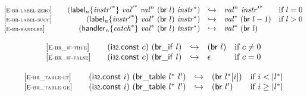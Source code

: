 \vspace{1ex}

$$
\begin{array}[t]{@{}lrcl@{}l@{}}
{[\textsc{\scriptsize E{-}br{-}label{-}zero}]} \quad & ({{\mathsf{label}}_{n}}{\{ {{\mathit{instr}'}^\ast} \}}~{{\mathit{val}'}^\ast}~{{\mathit{val}}^{n}}~(\mathsf{br}~l)~{{\mathit{instr}}^\ast}) & \hookrightarrow & {{\mathit{val}}^{n}}~{{\mathit{instr}'}^\ast} & \quad \mbox{if}~ l = 0 \\
{[\textsc{\scriptsize E{-}br{-}label{-}succ}]} \quad & ({{\mathsf{label}}_{n}}{\{ {{\mathit{instr}'}^\ast} \}}~{{\mathit{val}}^\ast}~(\mathsf{br}~l)~{{\mathit{instr}}^\ast}) & \hookrightarrow & {{\mathit{val}}^\ast}~(\mathsf{br}~l - 1) & \quad \mbox{if}~ l > 0 \\
{[\textsc{\scriptsize E{-}br{-}handler}]} \quad & ({{\mathsf{handler}}_{n}}{\{ {{\mathit{catch}}^\ast} \}}~{{\mathit{val}}^\ast}~(\mathsf{br}~l)~{{\mathit{instr}}^\ast}) & \hookrightarrow & {{\mathit{val}}^\ast}~(\mathsf{br}~l) \\
\end{array}
$$

\vspace{1ex}

$$
\begin{array}[t]{@{}lrcl@{}l@{}}
{[\textsc{\scriptsize E{-}br\_if{-}true}]} \quad & (\mathsf{i{\scriptstyle 32}}{.}\mathsf{const}~c)~(\mathsf{br\_if}~l) & \hookrightarrow & (\mathsf{br}~l) & \quad \mbox{if}~ c \neq 0 \\
{[\textsc{\scriptsize E{-}br\_if{-}false}]} \quad & (\mathsf{i{\scriptstyle 32}}{.}\mathsf{const}~c)~(\mathsf{br\_if}~l) & \hookrightarrow & \epsilon & \quad \mbox{if}~ c = 0 \\
\end{array}
$$

\vspace{1ex}

$$
\begin{array}[t]{@{}lrcl@{}l@{}}
{[\textsc{\scriptsize E{-}br\_table{-}lt}]} \quad & (\mathsf{i{\scriptstyle 32}}{.}\mathsf{const}~i)~(\mathsf{br\_table}~{l^\ast}~{l'}) & \hookrightarrow & (\mathsf{br}~{l^\ast}{}[i]) & \quad \mbox{if}~ i < {|{l^\ast}|} \\
{[\textsc{\scriptsize E{-}br\_table{-}ge}]} \quad & (\mathsf{i{\scriptstyle 32}}{.}\mathsf{const}~i)~(\mathsf{br\_table}~{l^\ast}~{l'}) & \hookrightarrow & (\mathsf{br}~{l'}) & \quad \mbox{if}~ i \geq {|{l^\ast}|} \\
\end{array}
$$

